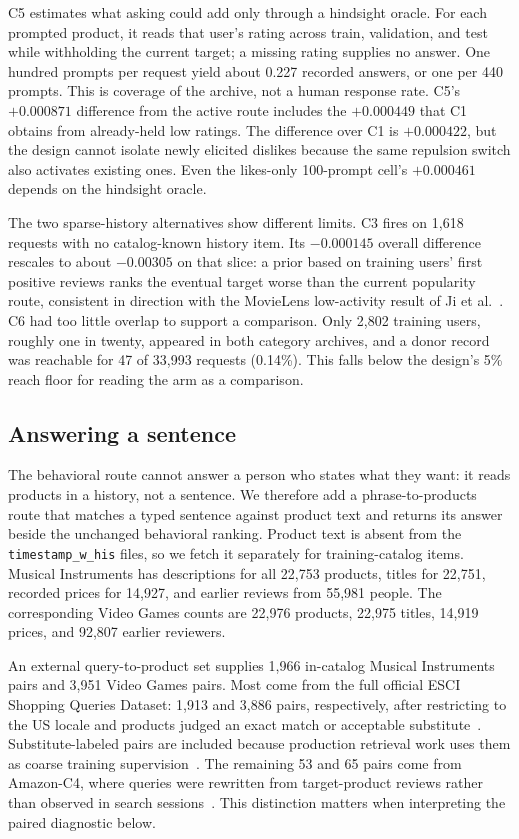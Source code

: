 \documentclass[11pt]{article}
\begin{document}
C5 estimates what asking could add only through a hindsight oracle. For each prompted product, it reads that user's rating across train, validation, and test while withholding the current target; a missing rating supplies no answer. One hundred prompts per request yield about 0.227 recorded answers, or one per 440 prompts. This is coverage of the archive, not a human response rate. C5's $+0.000871$ difference from the active route includes the $+0.000449$ that C1 obtains from already-held low ratings. The difference over C1 is $+0.000422$, but the design cannot isolate newly elicited dislikes because the same repulsion switch also activates existing ones. Even the likes-only 100-prompt cell's $+0.000461$ depends on the hindsight oracle.

The two sparse-history alternatives show different limits. C3 fires on 1,618 requests with no catalog-known history item. Its $-0.000145$ overall difference rescales to about $-0.00305$ on that slice: a prior based on training users' first positive reviews ranks the eventual target worse than the current popularity route, consistent in direction with the MovieLens low-activity result of Ji et al.~\cite{ji2020popularity}. C6 had too little overlap to support a comparison. Only 2,802 training users, roughly one in twenty, appeared in both category archives, and a donor record was reachable for 47 of 33,993 requests (0.14\%). This falls below the design's 5\% reach floor for reading the arm as a comparison.

\subsection{Answering a sentence}
The behavioral route cannot answer a person who states what they want: it reads products in a history, not a sentence. We therefore add a phrase-to-products route that matches a typed sentence against product text and returns its answer beside the unchanged behavioral ranking. Product text is absent from the \texttt{timestamp\_w\_his} files, so we fetch it separately for training-catalog items. Musical Instruments has descriptions for all 22,753 products, titles for 22,751, recorded prices for 14,927, and earlier reviews from 55,981 people. The corresponding Video Games counts are 22,976 products, 22,975 titles, 14,919 prices, and 92,807 earlier reviewers.

An external query-to-product set supplies 1,966 in-catalog Musical Instruments pairs and 3,951 Video Games pairs. Most come from the full official ESCI Shopping Queries Dataset: 1,913 and 3,886 pairs, respectively, after restricting to the US locale and products judged an exact match or acceptable substitute~\cite{reddy2022esci}. Substitute-labeled pairs are included because production retrieval work uses them as coarse training supervision~\cite{kothari2026semantic}. The remaining 53 and 65 pairs come from Amazon-C4, where queries were rewritten from target-product reviews rather than observed in search sessions~\cite{hou2026bridging}. This distinction matters when interpreting the paired diagnostic below.
\end{document}
